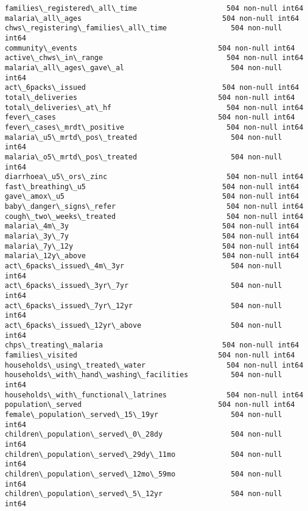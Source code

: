 \documentclass[11pt]{article}
\begin{document}
\begin{Verbatim}[commandchars=\\\{\}]
families\_registered\_all\_time                     504 non-null int64
malaria\_all\_ages                                 504 non-null int64
chws\_registering\_families\_all\_time               504 non-null int64
community\_events                                 504 non-null int64
active\_chws\_in\_range                             504 non-null int64
malaria\_all\_ages\_gave\_al                         504 non-null int64
act\_6packs\_issued                                504 non-null int64
total\_deliveries                                 504 non-null int64
total\_deliveries\_at\_hf                           504 non-null int64
fever\_cases                                      504 non-null int64
fever\_cases\_mrdt\_positive                        504 non-null int64
malaria\_u5\_mrtd\_pos\_treated                      504 non-null int64
malaria\_o5\_mrtd\_pos\_treated                      504 non-null int64
diarrhoea\_u5\_ors\_zinc                            504 non-null int64
fast\_breathing\_u5                                504 non-null int64
gave\_amox\_u5                                     504 non-null int64
baby\_danger\_signs\_refer                          504 non-null int64
cough\_two\_weeks\_treated                          504 non-null int64
malaria\_4m\_3y                                    504 non-null int64
malaria\_3y\_7y                                    504 non-null int64
malaria\_7y\_12y                                   504 non-null int64
malaria\_12y\_above                                504 non-null int64
act\_6packs\_issued\_4m\_3yr                         504 non-null int64
act\_6packs\_issued\_3yr\_7yr                        504 non-null int64
act\_6packs\_issued\_7yr\_12yr                       504 non-null int64
act\_6packs\_issued\_12yr\_above                     504 non-null int64
chps\_treating\_malaria                            504 non-null int64
families\_visited                                 504 non-null int64
households\_using\_treated\_water                   504 non-null int64
households\_with\_hand\_washing\_facilities          504 non-null int64
households\_with\_functional\_latrines              504 non-null int64
population\_served                                504 non-null int64
female\_population\_served\_15\_19yr                 504 non-null int64
children\_population\_served\_0\_28dy                504 non-null int64
children\_population\_served\_29dy\_11mo             504 non-null int64
children\_population\_served\_12mo\_59mo             504 non-null int64
children\_population\_served\_5\_12yr                504 non-null int64

\end{Verbatim}
\end{document}
